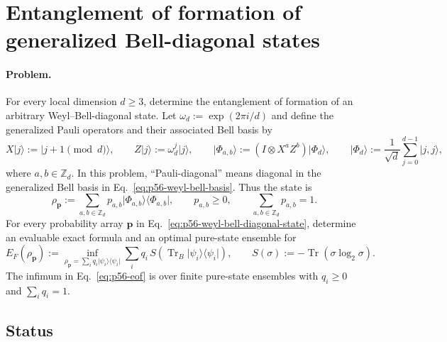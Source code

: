 \section{Entanglement of formation of generalized Bell-diagonal states}
\label{sec:op_a3a8680c50800797}

\paragraph{Problem.}
For every local dimension $d\geq3$, determine the entanglement of formation
of an arbitrary Weyl--Bell-diagonal state.  Let
$\omega_d:=\exp(2\pi i/d)$ and define the generalized Pauli operators and
their associated Bell basis by
\begin{equation}
  X\lvert j\rangle:=\lvert j+1\!\!\pmod d\rangle,
  \qquad
  Z\lvert j\rangle:=\omega_d^j\lvert j\rangle,
  \qquad
  \lvert\Phi_{a,b}\rangle
  :=(I\otimes X^aZ^b)\lvert\Phi_d\rangle,
  \qquad
  \lvert\Phi_d\rangle:=\frac1{\sqrt d}\sum_{j=0}^{d-1}\lvert j,j\rangle,
  \label{eq:p56-weyl-bell-basis}
\end{equation}
where $a,b\in\mathbb Z_d$.  In this problem, ``Pauli-diagonal'' means
diagonal in the generalized Bell basis in
Eq.~\eqref{eq:p56-weyl-bell-basis}.  Thus the state is
\begin{equation}
  \rho_{\mathbf p}
  :=\sum_{a,b\in\mathbb Z_d}p_{a,b}
     \lvert\Phi_{a,b}\rangle\!\langle\Phi_{a,b}\rvert,
  \qquad
  p_{a,b}\geq0,
  \qquad
  \sum_{a,b\in\mathbb Z_d}p_{a,b}=1.
  \label{eq:p56-weyl-bell-diagonal-state}
\end{equation}
For every probability array $\mathbf p$ in
Eq.~\eqref{eq:p56-weyl-bell-diagonal-state}, determine an evaluable exact
formula and an optimal pure-state ensemble for
\begin{equation}
  E_F(\rho_{\mathbf p})
  :=\inf_{\rho_{\mathbf p}=\sum_i q_i
                    \lvert\psi_i\rangle\!\langle\psi_i\rvert}
       \sum_i q_i\,
       S\!\left(\operatorname{Tr}_B
          \lvert\psi_i\rangle\!\langle\psi_i\rvert\right),
  \qquad
  S(\sigma):=-\operatorname{Tr}(\sigma\log_2\sigma).
  \label{eq:p56-eof}
\end{equation}
The infimum in Eq.~\eqref{eq:p56-eof} is over finite pure-state ensembles
with $q_i\geq0$ and $\sum_iq_i=1$.

\subsection*{Status}


